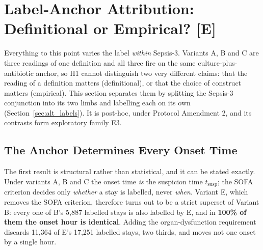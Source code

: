 

\section{Label-Anchor Attribution: Definitional or Empirical?
\texorpdfstring{[E]}{[E]}}
\label{sec:label_anchor_results}

Everything to this point varies the label \emph{within} Sepsis-3. Variants A, B
and C are three readings of one definition and all three fire on the same
culture-plus-antibiotic anchor, so H1 cannot distinguish two very different
claims: that the reading of a definition matters (definitional), or that the
choice of construct matters (empirical). This section separates them by
splitting the Sepsis-3 conjunction into its two limbs and labelling each on its
own (Section~\ref{sec:alt_labels}). It is post-hoc, under Protocol
Amendment 2, and its contrasts form exploratory family E3.

\subsection{The Anchor Determines Every Onset Time}

The first result is structural rather than statistical, and it can be stated
exactly. Under variants A, B and C the onset time \emph{is} the suspicion time
$t_{\text{susp}}$; the SOFA criterion decides only \emph{whether} a stay is
labelled, never \emph{when}. Variant E, which removes the SOFA criterion,
therefore turns out to be a strict superset of Variant B: every one of B's
5,887 labelled stays is also labelled by E, and in \textbf{100\% of them the
onset hour is identical}. Adding the organ-dysfunction requirement discards
11,364 of E's 17,251 labelled stays, two thirds, and moves not one onset
by a single hour.

